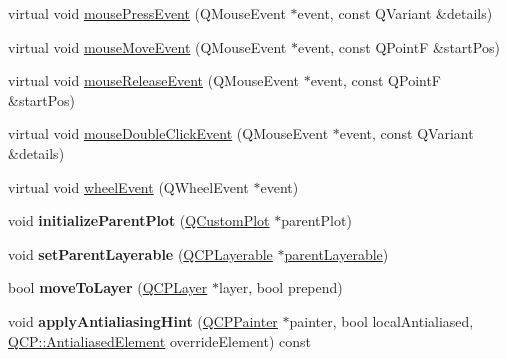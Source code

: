 \begin{DoxyCompactItemize}
\item 
virtual void \hyperlink{classQCPLayerable_af6567604818db90f4fd52822f8bc8376}{mouse\+Press\+Event} (Q\+Mouse\+Event $\ast$event, const Q\+Variant \&details)
\item 
virtual void \hyperlink{classQCPLayerable_a9eee1ba47fd69be111059ca3881933e4}{mouse\+Move\+Event} (Q\+Mouse\+Event $\ast$event, const Q\+PointF \&start\+Pos)
\item 
virtual void \hyperlink{classQCPLayerable_aa0d79b005686f668622bbe66ac03ba2c}{mouse\+Release\+Event} (Q\+Mouse\+Event $\ast$event, const Q\+PointF \&start\+Pos)
\item 
virtual void \hyperlink{classQCPLayerable_a4171e2e823aca242dd0279f00ed2de81}{mouse\+Double\+Click\+Event} (Q\+Mouse\+Event $\ast$event, const Q\+Variant \&details)
\item 
virtual void \hyperlink{classQCPLayerable_a47dfd7b8fd99c08ca54e09c362b6f022}{wheel\+Event} (Q\+Wheel\+Event $\ast$event)
\item 
void {\bfseries initialize\+Parent\+Plot} (\hyperlink{classQCustomPlot}{Q\+Custom\+Plot} $\ast$parent\+Plot)\hypertarget{classQCPLayerable_a8cbe5a0c9a5674249982f5ca5f8e02bc}{}\label{classQCPLayerable_a8cbe5a0c9a5674249982f5ca5f8e02bc}

\item 
void {\bfseries set\+Parent\+Layerable} (\hyperlink{classQCPLayerable}{Q\+C\+P\+Layerable} $\ast$\hyperlink{classQCPLayerable_a98d79f5b716d45eac4347befe546d0ec}{parent\+Layerable})\hypertarget{classQCPLayerable_aa23c893671f1f6744ac235cf2204cf3a}{}\label{classQCPLayerable_aa23c893671f1f6744ac235cf2204cf3a}

\item 
bool {\bfseries move\+To\+Layer} (\hyperlink{classQCPLayer}{Q\+C\+P\+Layer} $\ast$layer, bool prepend)\hypertarget{classQCPLayerable_af94484cfb7cbbddb7de522e9be71d9a4}{}\label{classQCPLayerable_af94484cfb7cbbddb7de522e9be71d9a4}

\item 
void {\bfseries apply\+Antialiasing\+Hint} (\hyperlink{classQCPPainter}{Q\+C\+P\+Painter} $\ast$painter, bool local\+Antialiased, \hyperlink{namespaceQCP_ae55dbe315d41fe80f29ba88100843a0c}{Q\+C\+P\+::\+Antialiased\+Element} override\+Element) const \hypertarget{classQCPLayerable_a62bd552d1a45aa9accb24b310542279e}{}\label{classQCPLayerable_a62bd552d1a45aa9accb24b310542279e}

\end{DoxyCompactItemize}
